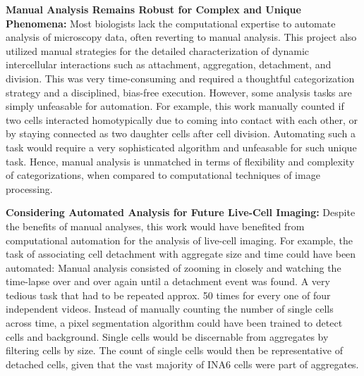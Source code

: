 \textbf{Manual Analysis Remains Robust for Complex and Unique Phenomena:}
Most biologists lack the computational expertise to automate analysis of
microscopy data, often reverting to manual analysis. This project also utilized
manual strategies for the detailed characterization of dynamic intercellular
interactions such as attachment, aggregation, detachment, and division. This was
very time-consuming and required a thoughtful categorization strategy and a
disciplined, bias-free execution. However, some analysis tasks are simply
unfeasable for automation. For example, this work manually counted if two \INA
cells interacted homotypically due to coming into contact with each other, or by
staying connected as two daughter cells after cell division. Automating such a
task would require a very sophisticated algorithm and unfeasable for such unique
task. Hence, manual analysis is unmatched in terms of flexibility and complexity
of categorizations, when compared to computational techniques of image
processing.


\textbf{Considering Automated Analysis for Future Live-Cell Imaging:}
Despite the benefits of manual analyses, this work would have benefited from
computational automation for the analysis of live-cell imaging. For example, the
task of associating \INA cell detachment with \INA aggregate size and time could
have been automated: Manual analysis consisted of zooming in closely and
watching the time-lapse over and over again until a detachment event was found.
A very tedious task that had to be repeated approx. 50 times for every one of
four independent videos. Instead of manually counting the number of single \INA
cells across time, a pixel segmentation algorithm could have been trained to
detect cells and background. Single cells would be discernable from aggregates
by filtering cells by size. The count of single cells would then be
representative of detached cells, given that the vast majority of INA6 cells
were part of aggregates.


\def\imagefeatures{%
    \emph{Features} are structural elements of an image, such as edges, corners,
    directions, colors. These features are mathematically extractable using
    \emph{filters} \dashedsentence{also referred to as \emph{convolution
            kernels}}, which are functions or algorithms applied to the pixel values of
    an image. For instance, \emph{gabor filters} can extract edges of one
    particular direction, resulting in an image of the same size as the input,
    but showing only edges of one direction. \emph{Feature extraction} is the
    process of applying multiple filters, resulting in a stack of filtered
    images called a feature vector. \cite{szeliskiFeatureDetectionMatching2011,
        guptaDeepLearningImage2019} }

